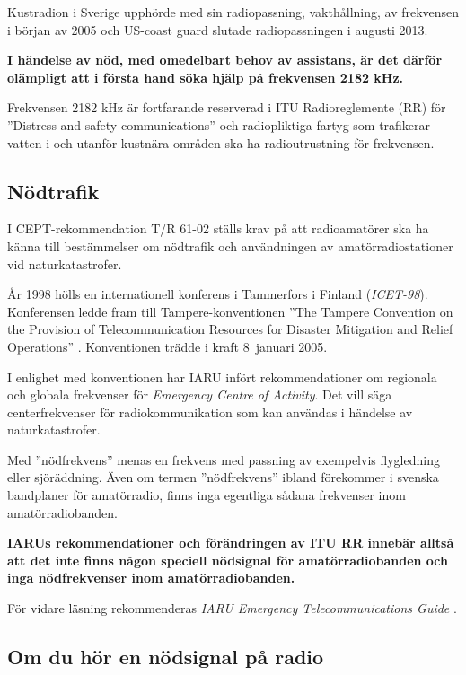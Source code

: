 Kustradion i Sverige upphörde med sin radiopassning, vakthållning, av frekvensen
i början av 2005 och US-coast guard slutade radiopassningen i augusti 2013.

\textbf{I händelse av nöd, med omedelbart behov av assistans, är det därför
	olämpligt att i första hand söka hjälp på frekvensen 2182 kHz.}

Frekvensen 2182 kHz är fortfarande reserverad i ITU Radioreglemente (RR)
\cite{ITU-RR} för ''Distress and safety communications'' och radiopliktiga
fartyg som trafikerar vatten i och utanför kustnära områden ska ha
radioutrustning för frekvensen.

\subsection{Nödtrafik}

I CEPT-rekommendation T/R 61-02 \cite{TR6102} ställs krav på att radioamatörer
ska ha känna till bestämmelser om nödtrafik och användningen av
amatörradiostationer vid naturkatastrofer.

År 1998 hölls en internationell konferens i Tammerfors i Finland
(\emph{ICET-98}).
Konferensen ledde fram till Tampere-konventionen ''The Tampere Convention on
the Provision of Telecommunication Resources for Disaster Mitigation and Relief
Operations'' \cite{TampereConvention}.
Konventionen trädde i kraft 8~januari 2005.

I enlighet med konventionen har IARU infört rekommendationer om regionala och
globala frekvenser för \emph{Emergency Centre of Activity}.
Det vill säga centerfrekvenser för radiokommunikation som kan användas i
händelse av naturkatastrofer.

Med ''nödfrekvens'' menas en frekvens med passning av exempelvis flygledning
eller sjöräddning.
Även om termen ''nödfrekvens'' ibland förekommer i svenska bandplaner för
amatörradio, finns inga egentliga sådana frekvenser inom amatörradiobanden.

\textbf{IARUs rekommendationer och förändringen av ITU RR innebär alltså att
  det inte finns någon speciell nödsignal för amatörradiobanden och inga
  nödfrekvenser inom amatörradiobanden.}

För vidare läsning rekommenderas
\emph{IARU Emergency Telecommunications Guide} \cite{IARU-ETG}.

\subsection{Om du hör en nödsignal på radio}

